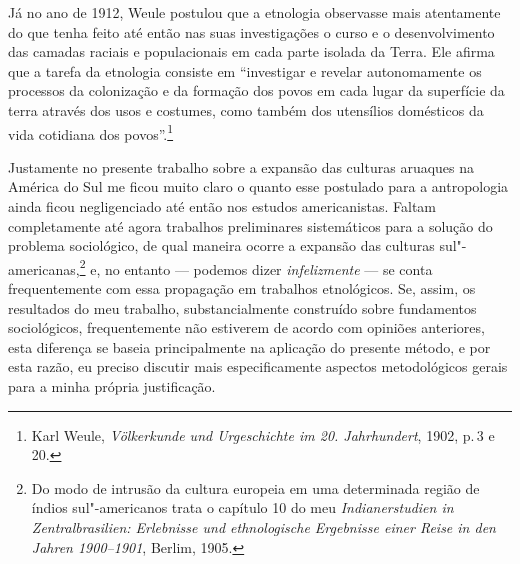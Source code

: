 Já no ano de 1912, Weule postulou que a etnologia observasse mais
atentamente do que tenha feito até então nas suas investigações o curso
e o desenvolvimento das camadas raciais e populacionais em cada parte
isolada da Terra. Ele afirma que a tarefa da etnologia consiste em
``investigar e revelar autonomamente os processos da colonização e da
formação dos povos em cada lugar da superfície da terra através dos usos
e costumes, como também dos utensílios domésticos da vida cotidiana dos
povos''.\footnote{Karl Weule, \textit{Völkerkunde und Urgeschichte im 20.
  Jahrhundert}, 1902, p.\,3 e 20.}

{Justamente no presente trabalho sobre a expansão das culturas aruaques na
América do Sul me ficou muito claro o quanto esse postulado para a
antropologia ainda ficou negligenciado até então nos estudos
americanistas. Faltam completamente até agora trabalhos preliminares
sistemáticos para a solução do problema sociológico, de qual maneira
ocorre a expansão das culturas sul"-americanas,\footnote{Do modo de
  intrusão da cultura europeia em uma determinada região de índios
  sul"-americanos trata o capítulo 10 do meu \textit{Indianerstudien in
  Zentralbrasilien: Erlebnisse und ethnologische Ergebnisse einer Reise
  in den Jahren 1900--1901}, Berlim, 1905.} e, no entanto --- podemos dizer
\textit{infelizmente} --- se conta frequentemente com essa propagação em
trabalhos etnológicos. Se, assim, os resultados do meu trabalho,
substancialmente construído sobre fundamentos sociológicos,
frequentemente não estiverem de acordo com opiniões anteriores, esta
diferença se baseia principalmente na aplicação do presente método, e
por esta razão, eu preciso discutir mais especificamente aspectos
metodológicos gerais para a minha própria justificação.}



